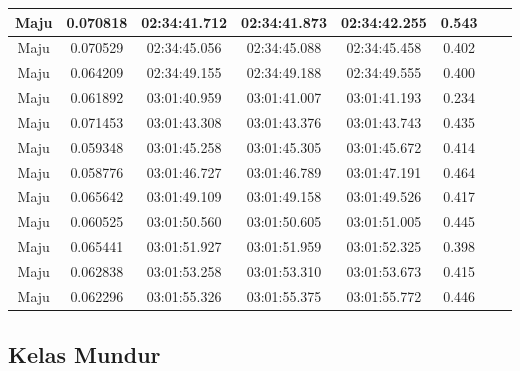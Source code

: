 \begin{longtable}{|c|c|c|c|c|c|c|c|}
      Maju & 0.070818 & 02:34:41.712 & 02:34:41.873 & 02:34:42.255 & 0.543 \\ \hline
      Maju & 0.070529 & 02:34:45.056 & 02:34:45.088 & 02:34:45.458 & 0.402 \\ \hline
      Maju & 0.064209 & 02:34:49.155 & 02:34:49.188 & 02:34:49.555 & 0.400 \\ \hline
      Maju & 0.061892 & 03:01:40.959 & 03:01:41.007 & 03:01:41.193 & 0.234 \\ \hline
      Maju & 0.071453 & 03:01:43.308 & 03:01:43.376  & 03:01:43.743 & 0.435 \\ \hline
      Maju & 0.059348 & 03:01:45.258 & 03:01:45.305 & 03:01:45.672 & 0.414 \\ \hline
      Maju & 0.058776 & 03:01:46.727 & 03:01:46.789  & 03:01:47.191 & 0.464 \\ \hline
      Maju & 0.065642 & 03:01:49.109 & 03:01:49.158 & 03:01:49.526 & 0.417 \\ \hline
      Maju & 0.060525 & 03:01:50.560 & 03:01:50.605 & 03:01:51.005 & 0.445 \\ \hline
      Maju & 0.065441 & 03:01:51.927 & 03:01:51.959  & 03:01:52.325 & 0.398 \\ \hline
      Maju & 0.062838 & 03:01:53.258 & 03:01:53.310 & 03:01:53.673 & 0.415 \\ \hline
      Maju & 0.062296 & 03:01:55.326 & 03:01:55.375 & 03:01:55.772 & 0.446 \\ \hline
\end{longtable}

\subsection{Kelas Mundur}

